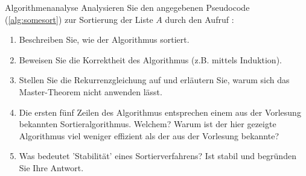 \documentclass{article}
\begin{document}
\begin{exercise}{Algorithmenanalyse}
  Analysieren Sie den angegebenen Pseudocode (\ref{alg:somesort}) zur Sortierung der Liste $A$ durch den Aufruf :
  
  \begin{enumerate}
    \item Beschreiben Sie, wie der Algorithmus sortiert.
    \item Beweisen Sie die Korrektheit des Algorithmus (z.B. mittels Induktion).
    \item Stellen Sie die Rekurrenzgleichung auf und erläutern Sie, warum sich das Master-Theorem nicht anwenden lässt.
    \item Die ersten fünf Zeilen des Algorithmus entsprechen einem aus der Vorlesung bekannten Sortieralgorithmus. Welchem? Warum ist der hier gezeigte Algorithmus viel weniger effizient als der aus der Vorlesung bekannte?
    \item Was bedeutet 'Stabilität' eines Sortierverfahrens? Ist  stabil und begründen Sie Ihre Antwort.
  \end{enumerate}


\end{exercise}
\end{document}
